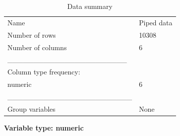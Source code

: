 \documentclass[
  letterpaper,
  DIV=11,
  numbers=noendperiod,
  oneside]{scrreprt}
\begin{document}
\begin{longtable}[]{@{}ll@{}}
\caption{Data summary}\tabularnewline
\toprule\noalign{}
\endfirsthead
\endhead
\bottomrule\noalign{}
\endlastfoot
Name & Piped data \\
Number of rows & 10308 \\
Number of columns & 6 \\
\_\_\_\_\_\_\_\_\_\_\_\_\_\_\_\_\_\_\_\_\_\_\_ & \\
Column type frequency: & \\
numeric & 6 \\
\_\_\_\_\_\_\_\_\_\_\_\_\_\_\_\_\_\_\_\_\_\_\_\_ & \\
Group variables & None \\
\end{longtable}

\textbf{Variable type: numeric}
\end{document}
